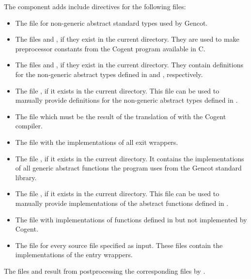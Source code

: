 The component adds include directives for the following files:
\begin{itemize}
\item The file  for non-generic abstract standard types used by Gencot.
\item The files  and , if they exist in the current directory.
They are used to make preprocessor constants from the Cogent program available in C.
\item The files  and , if they exist in the current directory. 
They contain definitions for the non-generic abstract types defined in  and 
, respectively.
\item The file , if it exists in the current directory. This file can be used to
manually provide definitions for the non-generic abstract types defined in .
\item The file  which must be the result of the translation of 
with the Cogent compiler.
\item The file  with the implementations of all exit wrappers.
\item The file , if it exists in the current directory. It contains the 
implementations of all generic abstract functions the program uses from the Gencot standard library.
\item The file , if it exists in the current directory. This file can be used to
manually provide implementations of the abstract functions defined in .
\item The file  with implementations of functions defined in 
but not implemented by Cogent.
\item The file  for every source file  specified as input. These files contain
the implementations of the entry wrappers.
\end{itemize}

The files  and  result from postprocessing the corresponding 
 files by .
